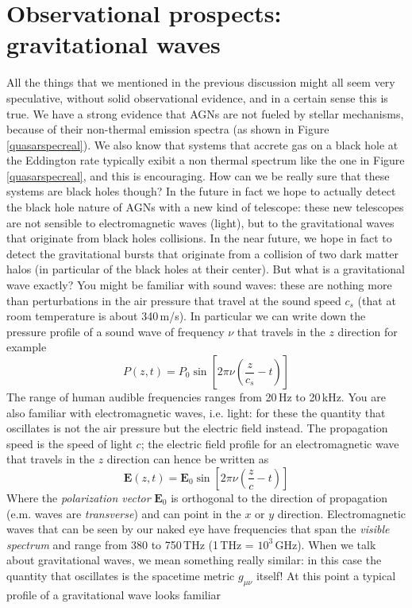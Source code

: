\documentclass[11pt, a4paper,oneside,openright]{book}
\numberwithin{equation}{section}
\begin{document}
\section{Observational prospects: gravitational waves}
All the things that we mentioned in the previous discussion might all seem very speculative, without solid observational evidence, and in a certain sense this is true. We have a strong evidence that AGNs are not fueled by stellar mechanisms, because of their non-thermal emission spectra (as shown in Figure \ref{quasarspecreal}). We also know that systems that accrete gas on a black hole at the Eddington rate typically exibit a non thermal spectrum like the one in Figure \ref{quasarspecreal}, and this is encouraging. How can we be really sure that these systems are black holes though? In the future in fact we hope to actually detect the black hole nature of AGNs with a new kind of telescope: these new telescopes are not sensible to electromagnetic waves (light), but to the gravitational waves that originate from black holes collisions. In the near future, we hope in fact to detect the gravitational bursts that originate from a collision of two dark matter halos (in particular of the black holes at their center). But what is a gravitational wave exactly? You might be familiar with sound waves: these are nothing more than perturbations in the air pressure that travel at the sound speed $c_s$ (that at room temperature is about 340\,m/s). In particular we can write down the pressure profile of a sound wave of frequency $\nu$ that travels in the $z$ direction for example
\begin{equation}
P(z,t)=P_0\sin{\left[2\pi\nu\left(\frac{z}{c_s}-t\right)\right]}
\end{equation}  
The range of human audible frequencies ranges from 20\,Hz to 20\,kHz. You are also familiar with electromagnetic waves, i.e. light: for these the quantity that oscillates is not the air pressure but the electric field instead. The propagation speed is the speed of light $c$; the electric field profile for an electromagnetic wave that travels in the $z$ direction can hence be written as 
\begin{equation}
\mathbf{E}(z,t) = \mathbf{E}_0\sin{\left[2\pi\nu\left(\frac{z}{c}-t\right)\right]}
\end{equation} 
Where the \textit{polarization vector} $\mathbf{E}_0$ is orthogonal to the direction of propagation (e.m. waves are \textit{transverse}) and can point in the $x$ or $y$ direction. Electromagnetic waves that can be seen by our naked eye have frequencies that span the \textit{visible spectrum} and range from 380 to 750\,THz (1\,THz = $10^3$\,GHz). When we talk about gravitational waves, we mean something really similar: in this case the quantity that oscillates is the spacetime metric $g_{\mu\nu}$ itself! At this point a typical profile of a gravitational wave looks familiar
\end{document}

